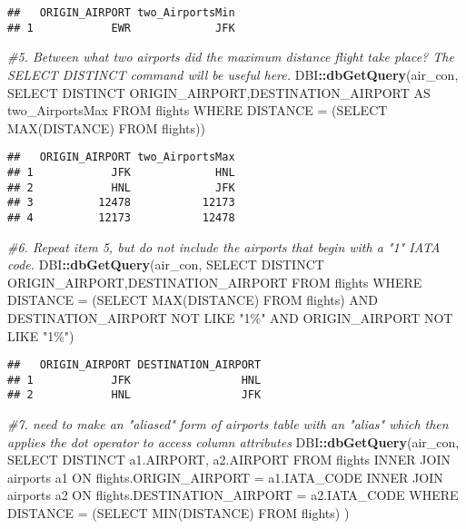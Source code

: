 \documentclass[
]{article}
\newenvironment{Shaded}{\begin{snugshade}}{\end{snugshade}}
\newcommand{\CommentTok}[1]{\textcolor[rgb]{0.56,0.35,0.01}{\textit{#1}}}
\newcommand{\FunctionTok}[1]{\textcolor[rgb]{0.13,0.29,0.53}{\textbf{#1}}}
\newcommand{\NormalTok}[1]{#1}
\newcommand{\SpecialCharTok}[1]{\textcolor[rgb]{0.81,0.36,0.00}{\textbf{#1}}}
\newcommand{\StringTok}[1]{\textcolor[rgb]{0.31,0.60,0.02}{#1}}
\begin{document}
\begin{verbatim}
##   ORIGIN_AIRPORT two_AirportsMin
## 1            EWR             JFK
\end{verbatim}

\begin{Shaded}
\begin{Highlighting}[]
\CommentTok{\#5. Between what two airports did the maximum distance flight take place? The \textasciigrave{}SELECT DISTINCT\textasciigrave{} command will be useful here.}
\NormalTok{DBI}\SpecialCharTok{::}\FunctionTok{dbGetQuery}\NormalTok{(air\_con, }\StringTok{\textquotesingle{}SELECT DISTINCT ORIGIN\_AIRPORT,DESTINATION\_AIRPORT AS two\_AirportsMax}
\StringTok{           FROM flights }
\StringTok{           WHERE DISTANCE = (SELECT MAX(DISTANCE) FROM flights)\textquotesingle{}}\NormalTok{)}
\end{Highlighting}
\end{Shaded}

\begin{verbatim}
##   ORIGIN_AIRPORT two_AirportsMax
## 1            JFK             HNL
## 2            HNL             JFK
## 3          12478           12173
## 4          12173           12478
\end{verbatim}

\begin{Shaded}
\begin{Highlighting}[]
\CommentTok{\#6.  Repeat item 5, but do not include the airports that begin with a "1" IATA code.}
\NormalTok{DBI}\SpecialCharTok{::}\FunctionTok{dbGetQuery}\NormalTok{(air\_con, }\StringTok{\textquotesingle{}SELECT DISTINCT ORIGIN\_AIRPORT,DESTINATION\_AIRPORT}
\StringTok{           FROM flights }
\StringTok{           WHERE DISTANCE = (SELECT MAX(DISTANCE) FROM flights) AND DESTINATION\_AIRPORT NOT LIKE "1\%" AND ORIGIN\_AIRPORT NOT LIKE "1\%"\textquotesingle{}}\NormalTok{)}
\end{Highlighting}
\end{Shaded}

\begin{verbatim}
##   ORIGIN_AIRPORT DESTINATION_AIRPORT
## 1            JFK                 HNL
## 2            HNL                 JFK
\end{verbatim}

\begin{Shaded}
\begin{Highlighting}[]
\CommentTok{\#7. need to make an "aliased" form of \textasciigrave{}airports\textasciigrave{} table with an "alias" which then applies the dot operator to access column attributes}
\NormalTok{DBI}\SpecialCharTok{::}\FunctionTok{dbGetQuery}\NormalTok{(air\_con, }\StringTok{\textquotesingle{}SELECT DISTINCT a1.AIRPORT, a2.AIRPORT}
\StringTok{                  FROM flights }
\StringTok{                  INNER JOIN airports a1}
\StringTok{                  ON  flights.ORIGIN\_AIRPORT = a1.IATA\_CODE  }
\StringTok{                  INNER JOIN airports a2}
\StringTok{                  ON  flights.DESTINATION\_AIRPORT = a2.IATA\_CODE}
\StringTok{                  WHERE DISTANCE = (SELECT MIN(DISTANCE) FROM flights)\textquotesingle{}}
\NormalTok{)}
\end{Highlighting}
\end{Shaded}
\end{document}
